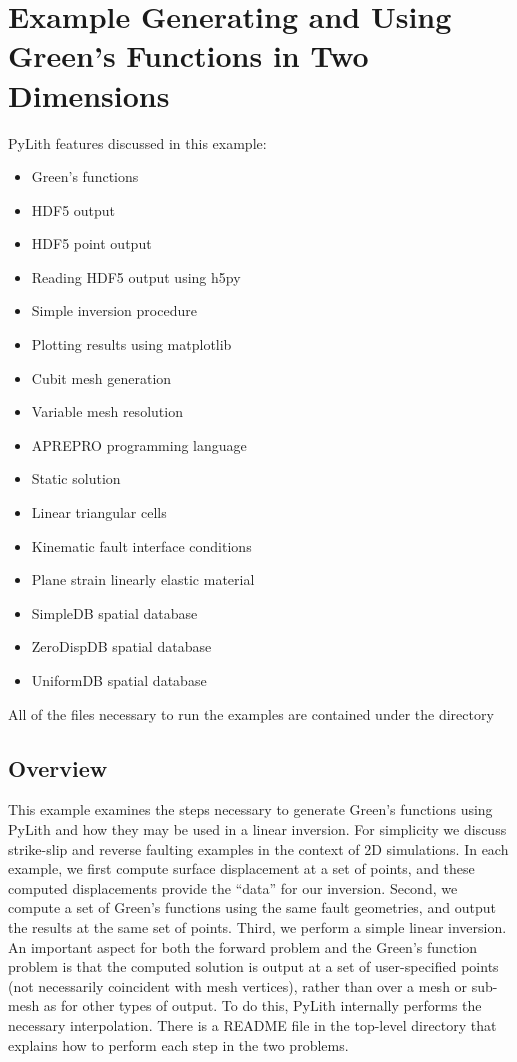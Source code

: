 \section{Example Generating and Using Green's Functions in Two Dimensions}
\label{sec:example:greensfns2d}

PyLith features discussed in this example:
\begin{itemize}
\item Green's functions
\item HDF5 output
\item HDF5 point output
\item Reading HDF5 output using h5py
\item Simple inversion procedure
\item Plotting results using matplotlib
\item Cubit mesh generation
\item Variable mesh resolution
\item APREPRO programming language
\item Static solution
\item Linear triangular cells
\item Kinematic fault interface conditions
\item Plane strain linearly elastic material
\item SimpleDB spatial database
\item ZeroDispDB spatial database
\item UniformDB spatial database
\end{itemize}
All of the files necessary to run the examples are contained under the
directory 


\subsection{Overview}

This example examines the steps necessary to generate Green's
functions using PyLith and how they may be used in a linear
inversion. For simplicity we discuss strike-slip and reverse faulting
examples in the context of 2D simulations. In each example, we first
compute surface displacement at a set of points, and these computed
displacements provide the ``data'' for our inversion. Second, we
compute a set of Green's functions using the same fault geometries,
and output the results at the same set of points. Third, we perform a
simple linear inversion. An important aspect for both the forward
problem and the Green's function problem is that the computed solution
is output at a set of user-specified points (not necessarily
coincident with mesh vertices), rather than over a mesh or sub-mesh as
for other types of output. To do this, PyLith internally performs the
necessary interpolation. There is a README file in the top-level
directory that explains how to perform each step in the two problems.


